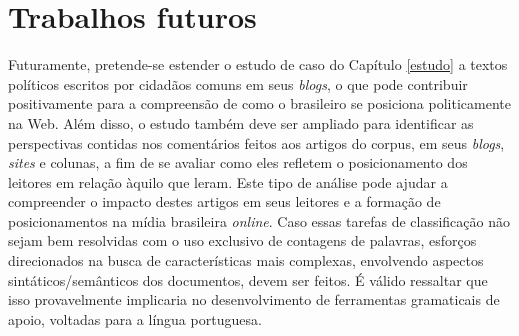 \section{Trabalhos futuros}

Futuramente, pretende-se estender o estudo de caso do Capítulo \ref{estudo} a textos políticos escritos por cidadãos comuns em seus \emph{blogs}, o que pode contribuir positivamente para a compreensão de como o brasileiro se posiciona politicamente na Web. Além disso, o estudo também deve ser ampliado para identificar as perspectivas contidas nos comentários feitos aos artigos do corpus, em seus \emph{blogs}, \emph{sites} e colunas, a fim de se avaliar como eles refletem o posicionamento dos leitores em relação àquilo que leram. Este tipo de análise pode ajudar a compreender o impacto destes artigos em seus leitores e a formação de posicionamentos na mídia brasileira \emph{online}. Caso essas tarefas de classificação não sejam bem resolvidas com o uso exclusivo de contagens de palavras, esforços direcionados na busca de características mais complexas, envolvendo aspectos sintáticos/semânticos dos documentos, devem ser feitos. É válido ressaltar que isso provavelmente implicaria no desenvolvimento de ferramentas gramaticais de apoio, voltadas para a língua portuguesa.


